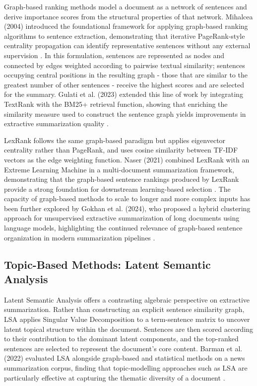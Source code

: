 \documentclass[12pt,twoside,en,win]{bmzhart}
\begin{document}
	Graph-based ranking methods model a document as a network of sentences and derive importance scores from 
	the structural properties of that network. Mihalcea (2004) introduced the foundational framework for 
	applying graph-based ranking algorithms to sentence extraction, demonstrating that iterative PageRank-style 
	centrality propagation can identify representative sentences without any external supervision \cite{k2}. In 
	this formulation, sentences are represented as nodes and connected by edges weighted according to pairwise 
	textual similarity; sentences occupying central positions in the resulting graph - those that are similar to 
	the greatest number of other sentences - receive the highest scores and are selected for the summary. Gulati 
	et al. (2023) extended this line of work by integrating TextRank with the BM25+ retrieval function, showing 
	that enriching the similarity measure used to construct the sentence graph yields improvements in extractive 
	summarization quality \cite{k1}.

	LexRank follows the same graph-based paradigm but applies eigenvector centrality rather than PageRank, 
	and uses cosine similarity between TF-IDF vectors as the edge weighting function. Naser (2021) combined 
	LexRank with an Extreme Learning Machine in a multi-document summarization framework, demonstrating that 
	the graph-based sentence rankings produced by LexRank provide a strong foundation for downstream 
	learning-based selection \cite{k4}. The capacity of graph-based methods to scale to longer and more complex inputs 
	has been further explored by Gokhan et al. (2024), who proposed a hybrid clustering approach for unsupervised 
	extractive summarization of long documents using language models, highlighting the continued relevance of 
	graph-based sentence organization in modern summarization pipelines \cite{k3}.

	\subsection{Topic-Based Methods: Latent Semantic Analysis}

	Latent Semantic Analysis offers a contrasting algebraic perspective on extractive summarization. Rather 
	than constructing an explicit sentence similarity graph, LSA applies Singular Value Decomposition to a 
	term-sentence matrix to uncover latent topical structure within the document. Sentences are then scored 
	according to their contribution to the dominant latent components, and the top-ranked sentences are 
	selected to represent the document's core content. Barman et al. (2022) evaluated LSA alongside graph-based 
	and statistical methods on a news summarization corpus, finding that topic-modelling approaches such as LSA 
	are particularly effective at capturing the thematic diversity of a document \cite{k5}.
\end{document}
